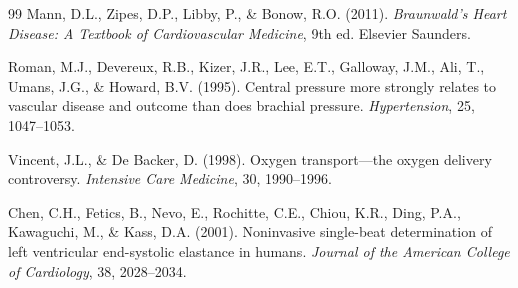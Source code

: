 \documentclass[12pt,a4paper]{article}
\theoremstyle{remark}
\begin{document}
\begin{thebibliography}{99}
Mann, D.L., Zipes, D.P., Libby, P., \& Bonow, R.O. (2011). \textit{Braunwald's Heart Disease: A Textbook of Cardiovascular Medicine}, 9th ed. Elsevier Saunders.

Roman, M.J., Devereux, R.B., Kizer, J.R., Lee, E.T., Galloway, J.M., Ali, T., Umans, J.G., \& Howard, B.V. (1995). Central pressure more strongly relates to vascular disease and outcome than does brachial pressure. \textit{Hypertension}, 25, 1047--1053.

Vincent, J.L., \& De Backer, D. (1998). Oxygen transport—the oxygen delivery controversy. \textit{Intensive Care Medicine}, 30, 1990--1996.

Chen, C.H., Fetics, B., Nevo, E., Rochitte, C.E., Chiou, K.R., Ding, P.A., Kawaguchi, M., \& Kass, D.A. (2001). Noninvasive single-beat determination of left ventricular end-systolic elastance in humans. \textit{Journal of the American College of Cardiology}, 38, 2028--2034.

\end{thebibliography}
\end{document}
